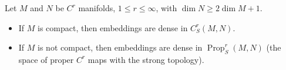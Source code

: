 Let $M$ and $N$ be $C^r$ manifolds, $1 \leqslant r \leqslant \infty$, with $\dim N \geqslant 2 \dim M + 1$.
\begin{itemize}
\item If $M$ is compact, then embeddings are dense in $C^r_S(M,N)$.
\item If $M$ is not compact, then embeddings are dense in $\operatorname{Prop}^r_S(M,N)$ (the space of proper $C^r$ maps with the strong topology).
\end{itemize}

